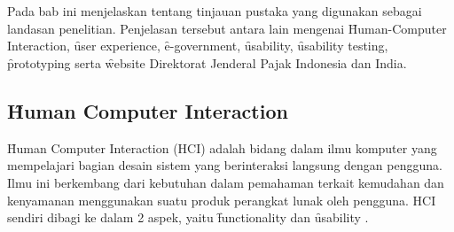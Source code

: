 \chapter{\babDua}
Pada bab ini menjelaskan tentang tinjauan pustaka yang digunakan sebagai landasan penelitian.
Penjelasan tersebut antara lain mengenai \f{Human-Computer Interaction}, \f{user experience}, \f{e-government},
\f{usability}, \f{usability testing}, \f{prototyping} serta \f{website} Direktorat Jenderal Pajak Indonesia dan India.

\section{\f{Human Computer Interaction}}
\f{Human Computer Interaction} (HCI) adalah bidang dalam ilmu komputer yang mempelajari bagian desain sistem yang berinteraksi langsung dengan pengguna. Ilmu ini berkembang dari kebutuhan dalam pemahaman terkait kemudahan dan kenyamanan menggunakan suatu produk perangkat lunak oleh pengguna. HCI sendiri dibagi ke dalam 2 aspek, yaitu \f{functionality} dan \f{usability} \citep{paper.mathew}. 
